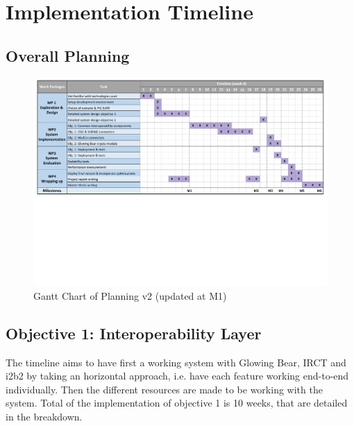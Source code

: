 \chapter{Implementation Timeline}
\section{Overall Planning}

\begin{figure}[h!]
    \centering
    \includegraphics[width=1\textwidth,trim={0 9cm 0 0},clip]{figures/gantt_chartt_v2.pdf}
    \caption{Gantt Chart of Planning v2 (updated at M1)}
    \label{fig:overallplanning}
\end{figure}


\section{Objective 1: Interoperability Layer}

The timeline aims to have first a working system with Glowing Bear, IRCT and i2b2 by taking an horizontal approach, i.e. have each feature working end-to-end individually.
Then the different resources are made to be working with the system.
Total of the implementation of objective 1 is 10 weeks, that are detailed in the breakdown.

